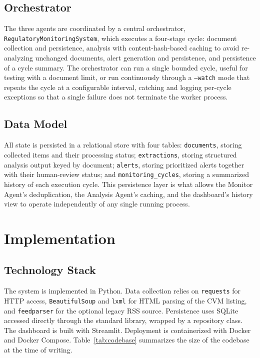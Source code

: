 \documentclass[conference]{IEEEtran}
\begin{document}
\subsection{Orchestrator}

The three agents are coordinated by a central orchestrator, \texttt{RegulatoryMonitoringSystem}, which executes a four-stage cycle: document collection and persistence, analysis with content-hash-based caching to avoid re-analyzing unchanged documents, alert generation and persistence, and persistence of a cycle summary. The orchestrator can run a single bounded cycle, useful for testing with a document limit, or run continuously through a \texttt{--watch} mode that repeats the cycle at a configurable interval, catching and logging per-cycle exceptions so that a single failure does not terminate the worker process.

\subsection{Data Model}

All state is persisted in a relational store with four tables: \texttt{documents}, storing collected items and their processing status; \texttt{extractions}, storing structured analysis output keyed by document; \texttt{alerts}, storing prioritized alerts together with their human-review status; and \texttt{monitoring\_cycles}, storing a summarized history of each execution cycle. This persistence layer is what allows the Monitor Agent's deduplication, the Analysis Agent's caching, and the dashboard's history view to operate independently of any single running process.

\section{Implementation}

\subsection{Technology Stack}

The system is implemented in Python. Data collection relies on \texttt{requests} for HTTP access, \texttt{BeautifulSoup} and \texttt{lxml} for HTML parsing of the CVM listing, and \texttt{feedparser} for the optional legacy RSS source. Persistence uses SQLite accessed directly through the standard library, wrapped by a repository class. The dashboard is built with Streamlit. Deployment is containerized with Docker and Docker Compose. Table~\ref{tab:codebase} summarizes the size of the codebase at the time of writing.
\end{document}
